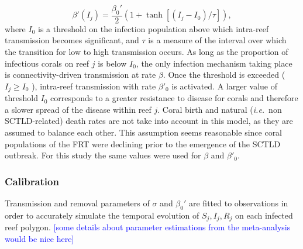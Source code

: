 \documentclass[utf8]{frontiersSCNS}
\newcommand{\ie}{{\it i.e.}\ }
\begin{document}
\begin{equation}
    \beta'(I_j) = \dfrac{\beta_0'}{2}(1+\tanh[(I_j-I_0)/\tau]),\label{eq:beta}
\end{equation}
where $I_0$ is a threshold on the infection population above which intra-reef transmission becomes significant, and $\tau$ is a measure of the interval over which the transition for low to high transmission occurs. As long as the proportion of infectious corals on reef $j$ is below $I_0$, the only infection mechanism taking place is connectivity-driven transmission at rate $\beta$. Once the threshold is exceeded ( $I_j \geq I_0$ ), intra-reef transmission with rate $\beta'_0$ is activated. A larger value of threshold $I_0$ corresponds to a greater resistance to disease for corals and therefore a slower spread of the disease within reef $j$. Coral birth and natural (\ie non SCTLD-related) death rates are not take into account in this model, as they are assumed to balance each other. This assumption seems reasonable since coral populations of the FRT were declining prior to the emergence of the SCTLD outbreak. For this study the same values were used for $\beta$ and $\beta'_0$.

\subsubsection{Calibration}
Transmission and removal parameters of $\sigma$ and $\beta_0'$ are fitted to observations in order to accurately simulate the temporal evolution of $S_j,I_j,R_j$ on each infected reef polygon. \textcolor{blue}{[some details about parameter estimations from the meta-analysis would be nice here]}
\end{document}
